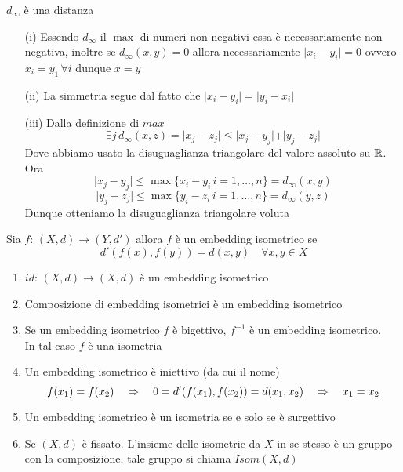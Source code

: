 \begin{prop}$d_\infty$ \`e  una distanza
\begin{itemize}
	\item[(i)] Essendo $d_\infty$ il $\max$ di numeri non negativi essa \`e necessariamente non negativa, inoltre se $d_\infty(x,y)=0$ allora necessariamente $\vert x_i - y_i\vert =0 $ ovvero $x_i=y_1 \, \forall i$ dunque $x=y$
	\item[(ii)] La simmetria segue dal fatto che $\vert x_i -y_i \vert = \vert y_i - x_i\vert$
	\item[(iii)] Dalla definizione di $max$ 
	$$ \exists j \, d_\infty (x,z) = \vert x_j - z_j \vert \leq \vert x_j - y_j \vert   + \vert y_j - z_j \vert $$
	Dove abbiamo usato la disuguaglianza triangolare del valore assoluto su $\mathbb{R}$.\\
	Ora
	$$ \vert x_j - y_j\vert \leq \max \{ x_i - y_i \, i=1, \dots, n \} = d_\infty(x,y)$$
	$$ \vert y_j - z_j\vert \leq \max \{ y_i - z_i \, i=1, \dots, n \} = d_\infty(y,z)$$
Dunque otteniamo la disuguaglianza triangolare voluta

\end{itemize}
\end{prop}

\spazio 
\begin{defn}\bianco 
Sia $f:\, (X,d) \to (Y,d')$ allora $f$ \`e un embedding isometrico se 
$$ d'(f(x), f(y))= d(x,y) \quad \forall x,y \in X$$	
\end{defn}
\begin{fatti}\bbianco
\begin{enumerate}
	\item $id:\, (X,d) \to (X,d)$ \`e un embedding isometrico
	\item Composizione di embedding isometrici \`e un embedding isometrico
	\item Se un embedding isometrico $f$ \`e bigettivo, $f^{-1}$ \`e un embedding isometrico.\\ In tal caso $f$ \`e una isometria
	\item Un embedding isometrico \`e iniettivo (da cui il nome)
	$$ f(x_1)=f(x_2) \quad \Rightarrow \quad  0= d'(f(x_1), f(x_2))=d(x_1,x_2) \quad \Rightarrow \quad x_1=x_2$$
	\item Un embedding isometrico \`e un isometria se e solo se \`e surgettivo 
	\item Se $(X,d)$ \`e fissato. L'insieme delle isometrie da $X$ in se stesso \`e un gruppo con la composizione, tale gruppo si chiama $Isom(X,d)$
\end{enumerate}
\end{fatti}
\newpage
